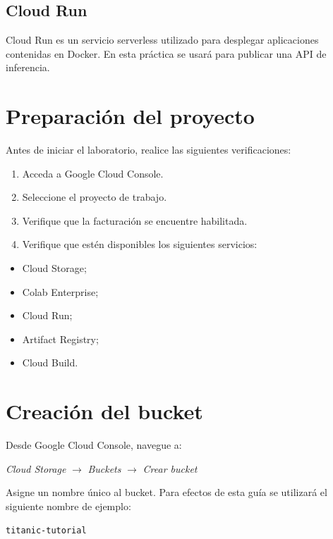 \documentclass[
  coursetitle={Cómputo Nube y Tecnologías Emergentes},
  coursehours={96},
  coursedate={Verano 2026},
  doctype={Tutorial},
  otherlangs={english,french},
  authorname={Lázaro},
  authorsurname={Bustio-Martínez},
  authortitle={PhD},
  role={Profesor Investigador},
  email={lbustio@inaoe.mx},
  phone={5559504000},
  ext={7459},
  institution={Instituto Nacional de Astrofísica, Óptica y Electrónica (INAOE)},
  department={Maestría en Ciencias en Tecnologías de Seguridad},
  address={Luis Enrique Erro 1, Sta. Ma. Tonantzintla, San Andrés Cholula, CP 72840, Puebla, México},
  margin={0.5in}
]{../../lbustio_lecture_notes}
\begin{document}
\subsection{Cloud Run}

Cloud Run es un servicio serverless utilizado para desplegar aplicaciones contenidas en Docker. En esta práctica se usará para publicar una API de inferencia.

\section{Preparación del proyecto}

Antes de iniciar el laboratorio, realice las siguientes verificaciones:

\begin{enumerate}
    \item Acceda a Google Cloud Console.
    \item Seleccione el proyecto de trabajo.
    \item Verifique que la facturación se encuentre habilitada.
    \item Verifique que estén disponibles los siguientes servicios:
\end{enumerate}

\begin{itemize}
    \item Cloud Storage;
    \item Colab Enterprise;
    \item Cloud Run;
    \item Artifact Registry;
    \item Cloud Build.
\end{itemize}

\section{Creación del bucket}

Desde Google Cloud Console, navegue a:

\begin{center}
    \textit{Cloud Storage} \(\rightarrow\) \textit{Buckets} \(\rightarrow\) \textit{Crear bucket}
\end{center}

Asigne un nombre único al bucket. Para efectos de esta guía se utilizará el siguiente nombre de ejemplo:

\begin{lstlisting}
titanic-tutorial
\end{lstlisting}
\end{document}

